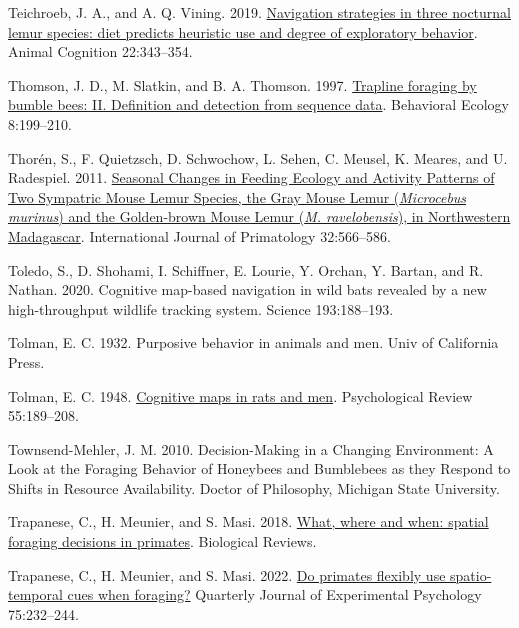 \documentclass[twoside,12pt,final]{ucthesis-CA2012}
\newenvironment{CSLReferences}%
  {}%
  {\par}
\begin{document}
\begin{ucmainmatter}
\begin{CSLReferences}{1}{0}
\leavevmode{}%
Teichroeb, J. A., and A. Q. Vining. 2019. \href{https://doi.org/10.1007/s10071-019-01247-4}{Navigation strategies in three nocturnal lemur species: diet predicts heuristic use and degree of exploratory behavior}. Animal Cognition 22:343--354.

\leavevmode{}%
Thomson, J. D., M. Slatkin, and B. A. Thomson. 1997. \href{https://doi.org/10.1093/beheco/8.2.199}{Trapline foraging by bumble bees: II. Definition and detection from sequence data}. Behavioral Ecology 8:199--210.

\leavevmode{}%
Thorén, S., F. Quietzsch, D. Schwochow, L. Sehen, C. Meusel, K. Meares, and U. Radespiel. 2011. \href{https://doi.org/10.1007/s10764-010-9488-1}{Seasonal Changes in Feeding Ecology and Activity Patterns of Two Sympatric Mouse Lemur Species, the Gray Mouse Lemur (\emph{Microcebus murinus}) and the Golden-brown Mouse Lemur (\emph{M. ravelobensis}), in Northwestern Madagascar}. International Journal of Primatology 32:566--586.

\leavevmode{}%
Toledo, S., D. Shohami, I. Schiffner, E. Lourie, Y. Orchan, Y. Bartan, and R. Nathan. 2020. Cognitive map-based navigation in wild bats revealed by a new high-throughput wildlife tracking system. Science 193:188--193.

\leavevmode{}%
Tolman, E. C. 1932. Purposive behavior in animals and men. Univ of California Press.

\leavevmode{}%
Tolman, E. C. 1948. \href{https://doi.org/10.4324/9780203789155-11}{Cognitive maps in rats and men}. Psychological Review 55:189--208.

\leavevmode{}%
Townsend-Mehler, J. M. 2010. Decision-Making in a Changing Environment: A Look at the Foraging Behavior of Honeybees and Bumblebees as they Respond to Shifts in Resource Availability. Doctor of Philosophy, Michigan State University.

\leavevmode{}%
Trapanese, C., H. Meunier, and S. Masi. 2018. \href{https://doi.org/10.1111/brv.12462}{What, where and when: spatial foraging decisions in primates}. Biological Reviews.

\leavevmode{}%
Trapanese, C., H. Meunier, and S. Masi. 2022. \href{https://doi.org/10.1177/1747021820970724}{Do primates flexibly use spatio-temporal cues when foraging?} Quarterly Journal of Experimental Psychology 75:232--244.


\end{CSLReferences}
\end{ucmainmatter}
\end{document}
